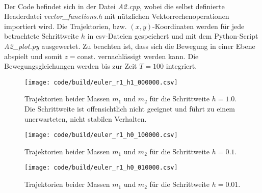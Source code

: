 \\
Der Code befindet sich in der Datei \textit{A2.cpp}, wobei die selbst definierte Headerdatei \textit{vector\_functions.h} mit nützlichen Vektorrechenoperationen importiert wird.
Die Trajektorien, bzw. $(x, y)$-Koordinaten werden für jede betrachtete Schrittweite $h$ in csv-Dateien gespeichert und mit dem Python-Script \textit{A2\_plot.py} ausgewertet.
Zu beachten ist, dass sich die Bewegung in einer Ebene abspielt und somit $z=\text{const.}$ vernachlässigt werden kann.
Die Bewegungsgleichungen werden bis zur Zeit $T=100$ integriert.
\begin{figure}
    \centering
    \texttt{[image: code/build/euler\_r1\_h1\_000000.csv]}
    \caption{Trajektorien beider Massen $m_1$ und $m_2$ für die Schrittweite $h=1.0$.
    Die Schrittweite ist offensichtlich nicht geeignet und führt zu einem unerwarteten, nicht stabilen Verhalten.
    }
\end{figure}
\begin{figure}
    \centering
    \texttt{[image: code/build/euler\_r1\_h0\_100000.csv]}
    \caption{Trajektorien beider Massen $m_1$ und $m_2$ für die Schrittweite $h=0.1$.
    }
\end{figure}
\begin{figure}
    \centering
    \texttt{[image: code/build/euler\_r1\_h0\_010000.csv]}
    \caption{Trajektorien beider Massen $m_1$ und $m_2$ für die Schrittweite $h=0.01$.
    }
\end{figure}
\FloatBarrier

